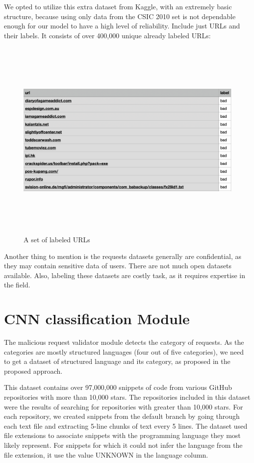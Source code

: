 We opted to utilize this extra dataset from Kaggle, with an extremely basic structure, because using only data from the CSIC 2010 set is not dependable enough for our model to have a high level of reliability. Include just URLs and their labels. It consists of over 400,000 unique already labeled URLs:
\begin{figure}[!h]
	\centering
	\includegraphics[width=\linewidth, height=10cm,keepaspectratio]{figures/dataset3.png}
  \caption{A set of labeled URLs}
\end{figure}

Another thing to mention is the requests datasets generally are confidential, as they may contain sensitive data of users. There are not much open datasets available. Also, labeling these datasets are costly task, as it requires expertise in the field.

\section{CNN classification Module}
\label{sec:CNN_module}
The malicious request validator module detects the category of requests. As the categories are mostly structured languages (four out of five categories), we need to get a dataset of structured language and its category, as proposed in the proposed approach.

This dataset contains over 97,000,000 snippets of code from various GitHub repositories with more than 10,000 stars. The repositories included in this dataset were the results of searching for repositories with greater than 10,000 stars. For each repository, we created snippets from the default branch by going through each text file and extracting 5-line chunks of text every 5 lines. The dataset used file extensions to associate snippets with the programming language they most likely represent. For snippets for which it could not infer the language from the file extension, it use the value UNKNOWN in the language column.

